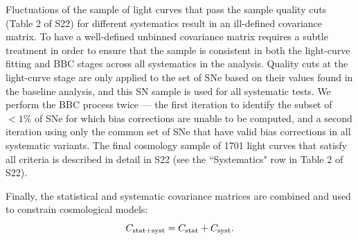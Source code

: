 \documentclass[twocolumn]{aastex63}
\begin{document}
Fluctuations of the sample of light curves that pass { the sample quality cuts (Table 2 of S22)} for different systematics result in an ill-defined covariance matrix. {To have a well-defined unbinned covariance matrix requires a subtle treatment in order to ensure that the sample is consistent in both the light-curve fitting and BBC stages across all systematics in the analysis. Quality cuts at the light-curve stage are only applied to the set of SNe based on their values found in the baseline analysis, and this SN sample is used
for all systematic tests. We perform the BBC process twice --- the first iteration to identify the subset of $<1\%$ of SNe for which bias corrections are unable to be computed, and a second iteration using only the common set of SNe that have valid bias corrections in all systematic variants. The final cosmology sample of 1701 light curves that satisfy all criteria is described in detail in S22 (see the ``Systematics" row in Table 2 of S22). }

Finally, the statistical and systematic covariance matrices are combined and used to constrain cosmological models:
\begin{equation}
\label{eq:cstatplussyst}
C_{{\rm stat+syst}} = C_{\rm stat} + C_{{\rm syst}}.
\end{equation}
\end{document}
